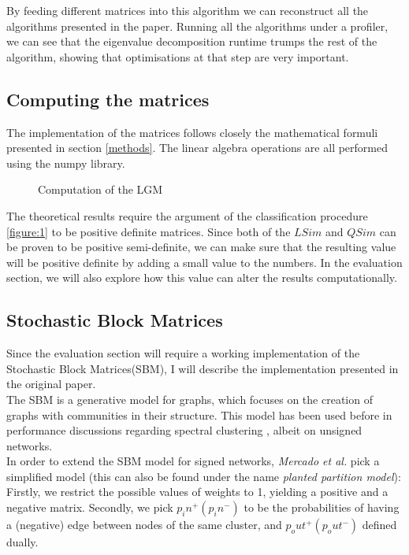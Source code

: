 \documentclass[11pt]{article}
\begin{document}
  By feeding different matrices into this algorithm we can reconstruct all the 
  algorithms presented in the paper.
  Running all the algorithms under a profiler, we can see that the eigenvalue 
  decomposition runtime trumps the rest of the algorithm, showing that optimisations
  at that step are very important. 

  \subsection{Computing the matrices}

  The implementation of the matrices follows closely the mathematical formuli presented
  in section \ref{methods}. The linear algebra operations are all performed using the numpy 
  library.

  \begin{figure}[!h]
    \label{figure:lgm}
    
    \caption{Computation of the LGM}
  \end{figure} 

  The theoretical results require the argument of the classification procedure \ref{figure:1}
  to be positive definite matrices. Since both of the $LSim$ and $QSim$ can be 
  proven to be positive semi-definite, we can make sure that the resulting 
  value will be positive definite by adding a small value to the numbers.
  In the evaluation section, we will also explore how this value can alter the 
  results computationally.

  \subsection{Stochastic Block Matrices}

  Since the evaluation section will require a working implementation of the 
  Stochastic Block Matrices(SBM), I will describe the implementation presented 
  in the original paper.  \\ 
  The SBM is a generative model for graphs, which focuses on the creation of 
  graphs with communities in their structure. This model has been used before
  in performance discussions regarding spectral clustering \cite{lei2015consistency}, 
  albeit on unsigned networks. \\ 

  In order to extend the SBM model for signed networks, \emph{Mercado et al.} pick 
  a simplified model (this can also be found under the name \emph{planted partition 
  model}): \\
  Firstly, we restrict the possible values of weights to 1, yielding a positive 
  and a negative matrix.
  Secondly, we pick $p_in^+ (p_in^-)$ to be the probabilities of having a (negative)
  edge between nodes of the same cluster, and $p_out^+ (p_out^-)$ defined dually.
\end{document}
